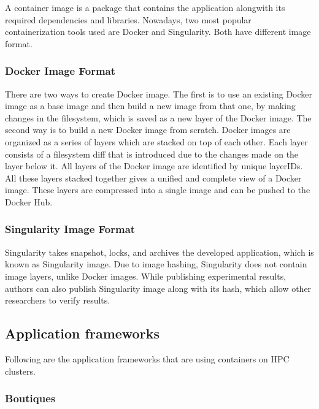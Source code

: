 \documentclass[a4paper,num-refs]{oup-contemporary}
\begin{document}
A container image is a package that contains the application alongwith its
required dependencies and libraries.
Nowadays, two most popular containerization tools used are Docker and Singularity.
Both have different image format.

\subsubsection{Docker Image Format}

There are two ways to create Docker image. The first is to use an existing
Docker image as a base image and then build a new image from that one, by
making changes in the filesystem, which is saved as a new layer of the
Docker image. The second way is to build a new Docker image from scratch.
Docker images are organized as a series of layers which are stacked on top
of each other. Each layer consists of a filesystem diff that is introduced
due to the changes made on the layer below it. All layers of the Docker image
are identified by unique layerIDs. All these layers stacked together gives a
unified and complete view of a Docker image. These layers are
compressed into a single image and can be pushed to the Docker Hub.

\subsubsection{Singularity Image Format}

Singularity takes snapshot, locks, and archives the developed application, which
is known as Singularity image. Due to image hashing, Singularity does not
contain image layers, unlike Docker images. While publishing experimental
results, authors can also publish Singularity image along with its hash, which
allow other researchers to verify results.

\subsection{Application frameworks}

Following are the application frameworks that are using containers
on HPC clusters.

\subsubsection{Boutiques}
\end{document}
